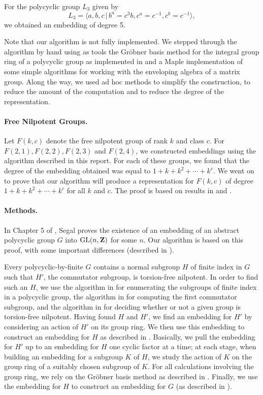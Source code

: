 For the polycyclic group $L_3$ given by
$$L_3 = \langle a,b,c \, | \,  b^a = c^3b, c^a = c^{-1}, c^b = c^{-1}\rangle,$$
we obtained an embedding of degree 5.

Note that our algorithm is not fully implemented.
We stepped through the algorithm by hand 
using as tools 
the Gr\"{o}bner basis method for the integral group ring
of a polycyclic group as implemented in \cite{Lo:jscpqa}
and a Maple implementation of some simple algorithms for
working with the enveloping algebra of a matrix group.
Along the way, we used ad hoc methods to simplify the construction,
to reduce the amount of the computation and to
reduce the degree of the representation. 

\paragraph{Free Nilpotent Groups.}
Let $F(k,c)$ denote the free nilpotent group of rank
$k$ and class $c$. For $F(2,1),F(2,2),F(2,3)$ and $F(2,4)$,
we constructed embeddings
using the algorithm described
in this report.
For each of these groups,
we found that 
the degree of the embedding obtained was equal to 
$1+k+k^2+\cdots+k^c$.
We went on to prove that our algorithm
will produce a representation for $F(k,c)$ 
of degree $1+k+k^2+\cdots+k^c$
for all $k$ and $c$.
The proof is based on results
in \cite{Hall:nilpgrps} and \cite{Passi}.

\paragraph{Methods.}
In Chapter 5 of \cite{Segal:book},
Segal proves the existence of an embedding of an abstract polycyclic group
$G$ into $\mbox{GL}(n,{\bf Z})$ for some $n$.
Our algorithm is based on this proof,
with some important differences (described in \cite{GO:thesis}).

Every polycyclic-by-finite $G$ contains a normal subgroup
$H$ of finite index in $G$ such that $H'$,
the commutator subgroup, is torsion-free nilpotent.
In order to find such an $H$,
we use the algorithm in \cite{Lo:finiteindex}
for enumerating the subgroups of finite index 
in a polycyclic group,
the algorithm in \cite{Sims} for computing
the first commutator subgroup, and 
the algorithm in \cite{GO:thesis}
for deciding whether or not a given group is torsion-free
nilpotent. Having found $H$ and $H'$,
we find an embedding for $H'$
by considering an action of $H'$ on its group ring.
We then use this embedding
to construct an embedding for $H$
as described in \cite{GO:thesis}.
Basically,
we pull the embedding for $H'$ up to an embedding for $H$
one cyclic factor at a time; at each stage,
when building an embedding for a subgroup
$K$ of $H$,  we study the
action of $K$ on the group ring
of a suitably chosen subgroup of $K$.
For all calculations involving the group ring,
we rely on the Gr\"obner basis method
as described 
in \cite{Lo:jscpqa}.
Finally, we use 
the embedding for $H$ to construct
an embedding for $G$ (as described in \cite{GO:thesis}).

